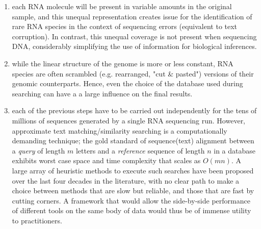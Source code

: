 \documentclass[10pt]{article}
\begin{document}
\begin{enumerate}
\item each RNA molecule will be present in variable amounts in the original sample, and this unequal representation creates issue for the identification of rare RNA species in the context of sequencing errors (equivalent to text corruption). In contrast, this unequal coverage is not present when sequencing DNA, considerably simplifying the use of information for biological inferences.
\item while the linear structure of the genome is more or less constant, RNA species are often scrambled (e.g. rearranged, "cut \& pasted") versions of their genomic counterparts. Hence, even the choice of the database used during searching can have a a large influence on the final results.
\item each of the previous steps have to be carried out independently for the tens of millions of sequences generated by a single RNA sequencing run. However, approximate text matching/similarity searching is a computationally demanding technique; the gold standard of sequence(text) alignment between a \textit{query} of length $m$ letters and a \textit{reference} sequence of length $n$ in a database exhibits worst case space and time complexity that scales as $O(mn)$. A large array of heuristic methods to execute such searches have been proposed over the last four decades in the literature\cite{song_new_2014,sahlin_effective_2021,bucher_sequence_1996,mitrophanov_statistical_2006}, with no clear path to make a choice between methods that are slow but reliable, and those that are fast by cutting corners. A framework that would allow the side-by-side performance of different tools on the same body of data would thus be of immense utility to practitioners.
\end{enumerate}
\end{document}
